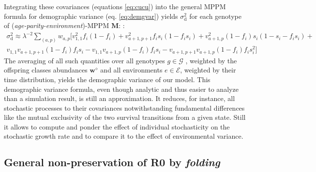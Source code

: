 \documentclass[10pt,a4paper]{article}
\newcommand{\M}{$\mathbf{M}$}
\begin{document}
Integrating these covariances (equations \ref{eq:cucu}) into the general MPPM formula for demographic variance (eq. \ref{eq:demgvar}) yields $\sigma_\mathrm{d}^2$ for each genotype of (\emph{age-parity-environment})-MPPM \M: :
\begin{multline}
\sigma_\mathrm{d}^2 \approx \lambda^{-2} \sum_{(a,p)} w_{a,p} [  v_{1,1}^{2}f_i(1-f_i)+ v_{a+1,p+1}^{2}f_{i}s_{i}(1-f_{i}s_{i})+ 
v_{a+1,p}^{2}(1-f_{i})s_{i}(1-s_{i}-f_{i}s_{i})+\\ v_{1,1}v_{a+1,p+1}(1-f_{i})f_{i}s_{i}-v_{1,1}v_{a+1,p}(1-f_{i})f_{i}s_{i}-v_{a+1,p+1}v_{a+1,p} (1-f_{i})f_{i}s_{i}^2 ]  
\end{multline}
The averaging of all such quantities over all genotypes $g \in \mathcal{G}$ , weighted by the offspring classes abundances $\bm{w}^{\diamond}$ and all environments $e \in \mathcal{E}$, weighted by their time distribution, yields the demographic variance of our model.
This demographic variance formula, even though analytic and thus easier to analyze than a simulation result, is still an approximation. It reduces, for instance, all stochastic processes to their covariances notwithstanding fundamental differences like the mutual exclusivity of the two survival transitions from a given state. Still it allows to compute and ponder the effect of individual stochasticity on the stochastic growth rate and to compare it to the effect of environmental variance.








\subsection{General non-preservation of R0 by \emph{folding}}
\label{sec:R0notpreservedingen}
\label{sec:R0notpres}
\end{document}
